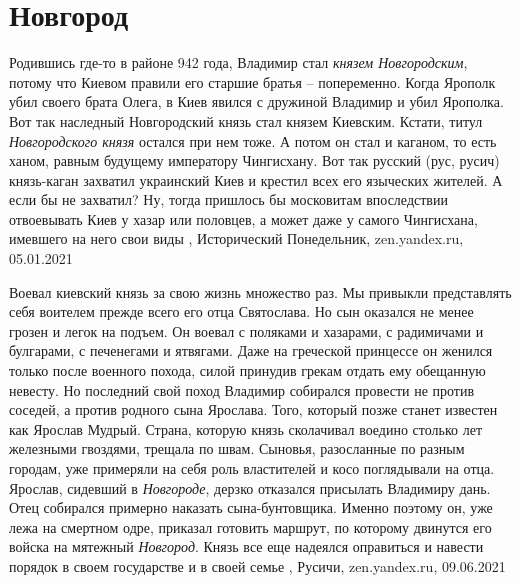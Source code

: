  
 
 
 
 
\chapter{Новгород}
\label{sec:slova.novgorod}

Родившись где-то в районе 942 года, Владимир стал \emph{князем Новгородским}, потому
что Киевом правили его старшие братья – попеременно. Когда Ярополк убил своего
брата Олега, в Киев явился с дружиной Владимир и убил Ярополка. Вот так
наследный Новгородский князь стал князем Киевским. Кстати, титул \emph{Новгородского
князя} остался при нем тоже. А потом он стал и каганом, то есть ханом, равным
будущему императору Чингисхану.  Вот так русский (рус, русич) князь-каган
захватил украинский Киев и крестил всех его языческих жителей. А если бы не
захватил?  Ну, тогда пришлось бы московитам впоследствии отвоевывать Киев у
хазар или половцев, а может даже у самого Чингисхана, имевшего на него свои
виды
,
Исторический Понедельник, zen.yandex.ru, 05.01.2021 

Воевал киевский князь за свою жизнь множество раз. Мы привыкли представлять
себя воителем прежде всего его отца Святослава. Но сын оказался не менее грозен
и легок на подъем. Он воевал с поляками и хазарами, с радимичами и булгарами, с
печенегами и ятвягами. Даже на греческой принцессе он женился только после
военного похода, силой принудив грекам отдать ему обещанную невесту.  Но
последний свой поход Владимир собирался провести не против соседей, а против
родного сына Ярослава. Того, который позже станет известен как Ярослав Мудрый.
Страна, которую князь сколачивал воедино столько лет железными гвоздями,
трещала по швам. Сыновья, разосланные по разным городам, уже примеряли на себя
роль властителей и косо поглядывали на отца. Ярослав, сидевший в
\emph{Новгороде}, дерзко отказался присылать Владимиру дань.  Отец собирался
примерно наказать сына-бунтовщика. Именно поэтому он, уже лежа на смертном
одре, приказал готовить маршрут, по которому двинутся его войска на мятежный
\emph{Новгород}. Князь все еще надеялся оправиться и навести порядок в своем
государстве и в своей семье
, 
Русичи, zen.yandex.ru, 09.06.2021
